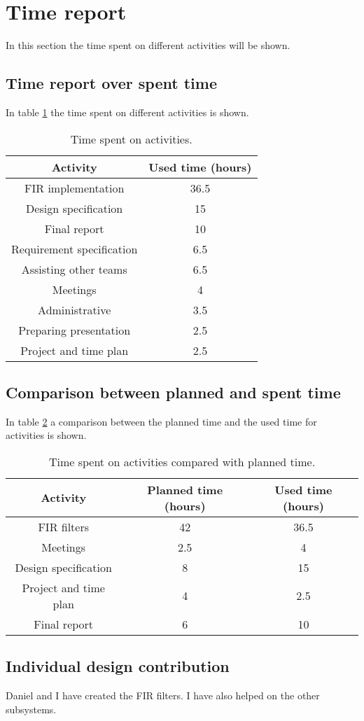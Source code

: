 \section{Time report}
In this section the time spent on different activities will be shown. 
\subsection{Time report over spent time}
In table \ref{tab:time} the time spent on different activities is shown.

\begin{table}[h]
  \caption{Time spent on activities.}
  \label{tab:time}
  \centering
  \begin{tabular}{|c|c|}
    \hline
    \textbf{Activity} & \textbf{Used time (hours)} \\ \hline
    FIR implementation & 36.5 \\ \hline
    Design specification & 15 \\ \hline
    Final report & 10 \\ \hline
    Requirement specification & 6.5 \\ \hline
    Assisting other teams & 6.5 \\ \hline
    Meetings & 4 \\ \hline
    Administrative & 3.5 \\ \hline
    Preparing presentation & 2.5 \\ \hline
    Project and time plan & 2.5 \\ \hline
  \end{tabular}
  \end{table}

\subsection{Comparison between planned and spent time}
In table \ref{tab:time_comp} a comparison between the planned time and the used time for activities is shown.
\begin{table}[h]
  \caption{Time spent on activities compared with planned time.}
  \label{tab:time_comp}
  \centering
  \begin{tabular}{|c|c|c|}
    \hline
    \textbf{Activity} & \textbf{Planned time (hours)} & \textbf{Used time (hours)} \\ \hline
      FIR filters & 42 & 36.5 \\ \hline
      Meetings & 2.5 & 4 \\ \hline
      Design specification & 8 & 15 \\ \hline
      Project and time plan & 4 & 2.5 \\ \hline
      Final report & 6 & 10 \\ \hline
  \end{tabular}
  \end{table}

\subsection{Individual design contribution}
Daniel and I have created the FIR filters. I have also helped on the other subsystems.